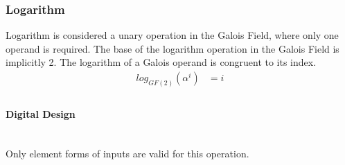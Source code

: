 \subsubsection{Logarithm} Logarithm is considered a unary operation in the
Galois Field, where only one operand is required. The base of the logarithm
operation in the Galois Field is implicitly 2. The logarithm of a Galois
operand is congruent to its index.
    \begin{equation*}
        \begin{split}
            log_{GF(2)}(\alpha^{i}) & = i \\
        \end{split}
    \end{equation*}

    \paragraph{{\small Digital Design}} \leavevmode \\ Only element forms of
    inputs are valid for this operation.
